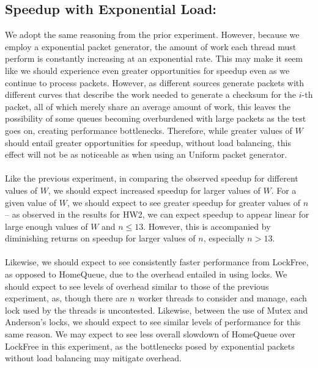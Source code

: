 \documentclass[]{article}
\begin{document}
\subsection{Speedup with Exponential Load:}
We adopt the same reasoning from the prior experiment. However, because we employ a exponential packet generator, the amount of work each thread must perform is constantly increasing at an exponential rate. This may make it seem like we should experience even greater opportunities for speedup even as we continue to process packets. However, as different sources generate packets with different curves that describe the work needed to generate a checksum for the $i$-th packet, all of which merely share an average amount of work, this leaves the possibility of some queues becoming overburdened with large packets as the test goes on, creating performance bottlenecks. Therefore, while greater values of $W$ should entail greater opportunities for speedup, without load balancing, this effect will not be as noticeable as when using an Uniform packet generator.
\\\\
Like the previous experiment, in comparing the observed speedup for different values of $W$, we should expect increased speedup for larger values of $W$. For a given value of $W$, we should expect to see greater speedup for greater values of $n$ -- as observed in the results for HW2, we can expect speedup to appear linear for large enough values of $W$ and $n \leq 13$. However, this is accompanied by diminishing returns on speedup for larger values of $n$, especially $n > 13$.
\\\\
Likewise, we should expect to see consistently faster performance from LockFree, as opposed to HomeQueue, due to the overhead entailed in using locks. We should expect to see levels of overhead similar to those of the previous experiment, as, though there are $n$ worker threads to consider and manage, each lock used by the threads is uncontested. Likewise, between the use of Mutex and Anderson's locks, we should expect to see similar levels of performance for this same reason. We may expect to see less overall slowdown of HomeQueue over LockFree in this experiment, as the bottlenecks posed by exponential packets without load balancing may mitigate overhead.
\end{document}
